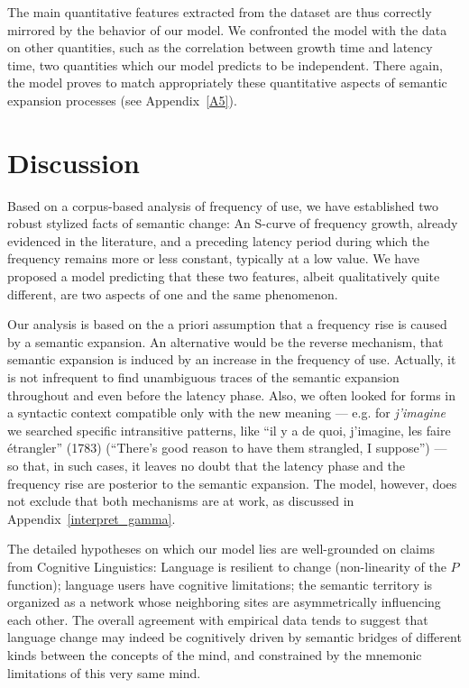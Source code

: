 \documentclass[12pt,twocolumn,amsmath,amssymb,aps,longbibliography]{revtex4-1}  %
\newcommand{\tit}{\textit}
\begin{document}
The main quantitative features extracted from the dataset are thus correctly mirrored by the behavior of our model. We confronted the model with the data on other quantities, such as the correlation between growth time and latency time, two quantities which our model predicts to be independent. There again, the model proves to match appropriately these quantitative aspects of semantic expansion processes (see Appendix~\ref{A5}).

\section*{Discussion} 

Based on a corpus-based analysis of frequency of use, we have established two robust stylized facts of semantic change: An S-curve of frequency growth, already evidenced in the literature, and a preceding latency period during which the frequency remains more or less constant, typically at a low value.  We have proposed a model predicting that these two features, albeit qualitatively quite different, are two aspects of one and the same phenomenon.

Our analysis is based on the a priori assumption that a frequency rise is caused by a semantic expansion. An alternative would be the reverse mechanism, that semantic expansion is induced by an increase in the frequency of use. Actually, it is not infrequent to find unambiguous traces of the semantic expansion throughout and even before the latency phase. Also, we often looked for forms in a syntactic context compatible only with the new meaning --- e.g. for \tit{j'imagine} we searched specific intransitive patterns, like ``il y a de quoi, j'imagine, les faire \'etrangler'' (1783) (``There's good reason to have them strangled, I suppose'') --- so that, in such cases, it leaves no doubt that the latency phase and the frequency rise are posterior to the semantic expansion. The model, however, does not exclude that both mechanisms are at work, as discussed in Appendix~\ref{interpret_gamma}.

The detailed hypotheses on which our model lies are well-grounded on claims from Cognitive Linguistics: Language is resilient to change (non-linearity of the $P$ function); language users have cognitive limitations; the semantic territory is organized as a network whose neighboring sites are asymmetrically influencing each other. The overall agreement with empirical data tends to suggest that language change may indeed be cognitively driven by semantic bridges of different kinds between the concepts of the mind, and constrained by the mnemonic limitations of this very same mind. 
\end{document}
